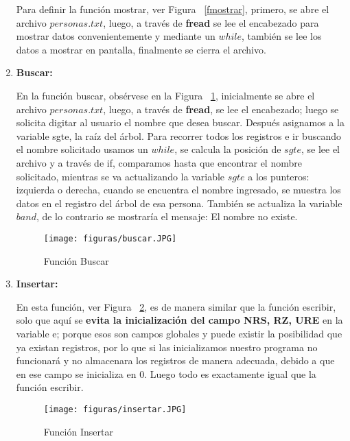 \documentclass[10pt,conference]{IEEEtran}
\begin{document}
\begin{enumerate}[]
         \par Para definir la función mostrar, ver Figura ~\ref{fmostrar}, primero, se abre el archivo $personas.txt$, luego, a través de \textbf{fread} se lee el encabezado para mostrar datos convenientemente y mediante un $while$, también se lee los datos a mostrar en pantalla, finalmente se cierra el archivo.
     
    \item {\textbf{Buscar:}}
        \par En la función buscar, obsérvese en la Figura ~\ref{fbuscar}, inicialmente se abre el archivo $personas.txt$, luego, a través de \textbf{fread}, se lee el encabezado; luego se solicita digitar al usuario el nombre que desea buscar. Después asignamos a la variable sgte, la raíz del árbol. Para recorrer todos los registros e ir buscando el nombre solicitado usamos un $while$, se calcula la posición de $sgte$, se lee el archivo y a través de if, comparamos hasta que encontrar el nombre solicitado, mientras se va actualizando la variable $sgte$ a los punteros: izquierda o derecha, cuando se encuentra el nombre ingresado, se muestra los datos en el registro del árbol de esa persona. También se actualiza la variable $band$, de lo contrario se mostraría el mensaje: El nombre no existe.
        
         \begin{figure}[H]
            \begin{center}
            \texttt{[image: figuras/buscar.JPG]}
            \caption{Función Buscar}
             \label{fbuscar} 
             \end{center}
        \end{figure}
  
    \item {\textbf{Insertar:}}
        \par En esta función, ver Figura ~\ref{finsertar}, es de manera similar que la función escribir, solo que aquí se \textbf{evita la inicialización del campo NRS, RZ, URE} en la variable e; porque esos son campos globales y puede existir la posibilidad que ya existan registros, por lo que si las inicializamos nuestro programa no funcionará y no almacenara los registros de manera adecuada, debido a que en ese campo se inicializa en 0. Luego todo es exactamente igual que la función escribir.
        
        \begin{figure}[H]
            \begin{center}
            \texttt{[image: figuras/insertar.JPG]}
            \caption{Función Insertar}
             \label{finsertar} 
             \end{center}
        \end{figure}
    

\end{enumerate}
\end{document}
